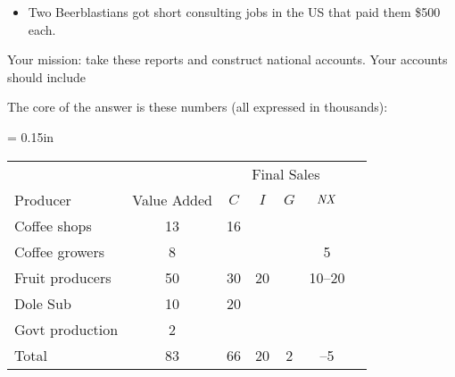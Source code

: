 \documentclass[12pt]{exam}
\newcommand{\NX}{\mbox{\it NX\/}}
\begin{document}
\begin{questions}
\begin{itemize}
\item Two Beerblastians got short
consulting jobs in the US that paid them \$500 each.
\end{itemize}
%
Your mission:  take these reports and construct national accounts.  
Your accounts should include 

\begin{solution}
The core of the answer is these numbers 
(all expressed in thousands):  
%
\begin{center}
\tabcolsep = 0.15in
\begin{tabular}{lcccccc} 
\hline\hline%
       &&  \multicolumn{4}{c}{Final Sales} \\ 
\cline{3-6}
Producer   &  Value Added &  $C$ & $I$ & $G$ & $\NX$      \\
\hline\hline%
Coffee shops &  13  & 16  \\
Coffee growers & 8 & & & & 5 \\
Fruit producers & 50 & 30 & 20 & & 10--20 \\
Dole Sub  & 10 & 20  \\
Govt production & 2 \\
\hline 
Total & 83 & 66 & 20 & 2 & --5 \\
\hline\hline%
\end{tabular}
\end{center}


\end{solution}
\end{questions}
\end{document}
